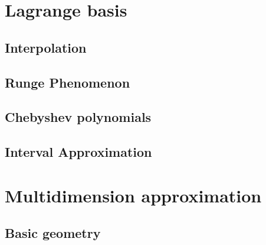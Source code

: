 \section[Lagrange]{Lagrange basis}
\label{sec:lagrange-basis}

\subsection{Interpolation}
\label{sec:interpolation}


\begin{frame}{}
  
\end{frame}

\subsection{Runge Phenomenon}
\label{sec:runge-phenomenon}

\begin{frame}{}
  
\end{frame}

\subsection{Chebyshev polynomials}
\label{sec:chebysh-polyn}

\begin{frame}{}
  
\end{frame}

\subsection[Interval]{Interval Approximation}
\label{sec:interv-interp}

\begin{frame}{}
  
\end{frame}


\section{Multidimension approximation}
\label{sec:mult-interp}

\subsection{Basic geometry}
\label{sec:basic-geometry}

